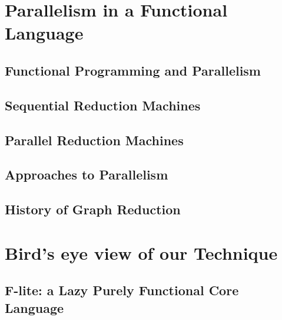 \documentclass[openright, dottedtoc, headinclude, footinclude=true, a4paper, numbers=noenddot]{scrreprt}
\begin{document}
    \chapter{Parallelism in a Functional Language}
    \label{chap:background}
    
    
        \section{Functional Programming and Parallelism}
        \label{sec:FPandPar}
        
    
        \section{Sequential Reduction Machines}
        \label{sec:SequentialMachines}
        
    
        \section{Parallel Reduction Machines}
        \label{sec:ParallelMachines}
        
    
        \section{Approaches to Parallelism}
        \label{sec:Approaches}
        
        
        \section{History of Graph Reduction}
        

    \chapter{Bird's eye view of our Technique}
    \label{chap:overview}
    

        \section{F-lite: a Lazy Purely Functional Core Language}
        \label{sec:Flite}
        
        
\end{document}
